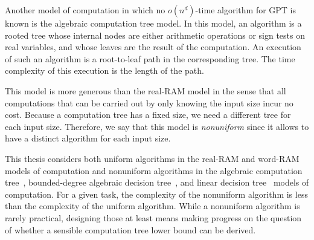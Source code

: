 Another model of computation in which no \(o(n^d)\)-time algorithm for GPT
is known is the algebraic computation tree model.
%
In this model, an algorithm is a rooted tree whose internal nodes are either
arithmetic operations or sign tests on real variables, and whose leaves are the
result of the computation.
%
An execution of such an algorithm is a root-to-leaf path in the corresponding
tree.
%
The time complexity of this execution is the length of the path.

This model is
more generous than the real-RAM model in the sense that all computations that
can be carried out by only knowing the input size incur no cost.
%
Because a computation tree has a fixed size, we need a different tree for each
input size.
%
Therefore,
we say that this model is \emph{nonuniform} since it allows to have a
distinct algorithm for each input size.

This thesis considers both uniform algorithms in the real-RAM and word-RAM
models of computation and nonuniform algorithms
in the algebraic computation tree~\cite[Section~2]{Be83},
bounded-degree algebraic decision tree~\cite[Section~2]{SY82},
and linear decision tree~\cite[Section~2]{DL78} models of computation.
%
For a given task, the complexity of the nonuniform algorithm is less than
the complexity of the uniform algorithm.
%
While a nonuniform algorithm is rarely practical, designing those at least
means making progress on the question of whether a sensible computation tree
lower bound can be derived.
